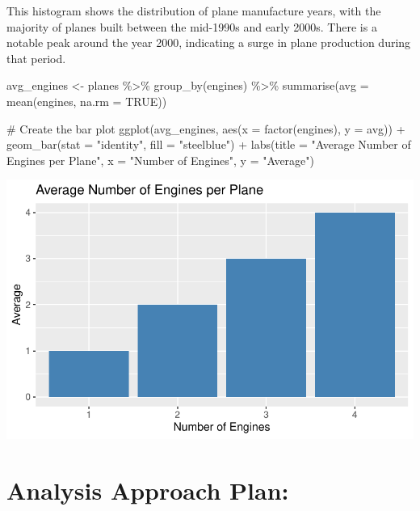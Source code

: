 \documentclass[
  10pt,
  letterpaper,
  DIV=11,
  numbers=noendperiod]{scrartcl}
\newenvironment{Shaded}{\begin{snugshade}}{\end{snugshade}}
\newcommand{\AttributeTok}[1]{\textcolor[rgb]{0.40,0.45,0.13}{#1}}
\newcommand{\CommentTok}[1]{\textcolor[rgb]{0.37,0.37,0.37}{#1}}
\newcommand{\ConstantTok}[1]{\textcolor[rgb]{0.56,0.35,0.01}{#1}}
\newcommand{\FunctionTok}[1]{\textcolor[rgb]{0.28,0.35,0.67}{#1}}
\newcommand{\NormalTok}[1]{\textcolor[rgb]{0.00,0.23,0.31}{#1}}
\newcommand{\OtherTok}[1]{\textcolor[rgb]{0.00,0.23,0.31}{#1}}
\newcommand{\SpecialCharTok}[1]{\textcolor[rgb]{0.37,0.37,0.37}{#1}}
\newcommand{\StringTok}[1]{\textcolor[rgb]{0.13,0.47,0.30}{#1}}
\begin{document}
This histogram shows the distribution of plane manufacture years, with
the majority of planes built between the mid-1990s and early 2000s.
There is a notable peak around the year 2000, indicating a surge in
plane production during that period.

\begin{Shaded}
\begin{Highlighting}[numbers=left,,]
\NormalTok{avg\_engines }\OtherTok{\textless{}{-}}\NormalTok{ planes }\SpecialCharTok{\%\textgreater{}\%}
  \FunctionTok{group\_by}\NormalTok{(engines) }\SpecialCharTok{\%\textgreater{}\%}
  \FunctionTok{summarise}\NormalTok{(}\AttributeTok{avg =} \FunctionTok{mean}\NormalTok{(engines, }\AttributeTok{na.rm =} \ConstantTok{TRUE}\NormalTok{))}

\CommentTok{\# Create the bar plot}
\FunctionTok{ggplot}\NormalTok{(avg\_engines, }\FunctionTok{aes}\NormalTok{(}\AttributeTok{x =} \FunctionTok{factor}\NormalTok{(engines), }\AttributeTok{y =}\NormalTok{ avg)) }\SpecialCharTok{+}
  \FunctionTok{geom\_bar}\NormalTok{(}\AttributeTok{stat =} \StringTok{"identity"}\NormalTok{, }\AttributeTok{fill =} \StringTok{"steelblue"}\NormalTok{) }\SpecialCharTok{+}
  \FunctionTok{labs}\NormalTok{(}\AttributeTok{title =} \StringTok{"Average Number of Engines per Plane"}\NormalTok{, }\AttributeTok{x =} \StringTok{"Number of Engines"}\NormalTok{, }\AttributeTok{y =} \StringTok{"Average"}\NormalTok{)}
\end{Highlighting}
\end{Shaded}

\includegraphics{6-StatistciallySpeaking_files/figure-pdf/unnamed-chunk-11-1.pdf}

\section{Analysis Approach Plan:}\label{analysis-approach-plan}
\end{document}
